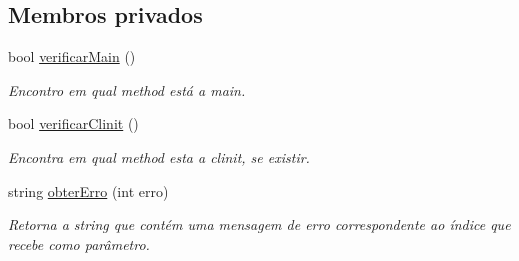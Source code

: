 \subsection*{Membros privados}
\begin{DoxyCompactItemize}
\item 
bool \hyperlink{classLeitorExibidor_a2d486c9289a5d50a7fb00afffd2fa760}{verificar\+Main} ()
\begin{DoxyCompactList}\small\item\em Encontro em qual method está a main. \end{DoxyCompactList}\item 
bool \hyperlink{classLeitorExibidor_a8aeff3d072e77288215e5a070e958cf0}{verificar\+Clinit} ()
\begin{DoxyCompactList}\small\item\em Encontra em qual method esta a clinit, se existir. \end{DoxyCompactList}\item 
string \hyperlink{classLeitorExibidor_abf046987d5b3f0ec33794a547a8f9e25}{obter\+Erro} (int erro)
\begin{DoxyCompactList}\small\item\em Retorna a string que contém uma mensagem de erro correspondente ao índice que recebe como parâmetro. \end{DoxyCompactList}\end{DoxyCompactItemize}

